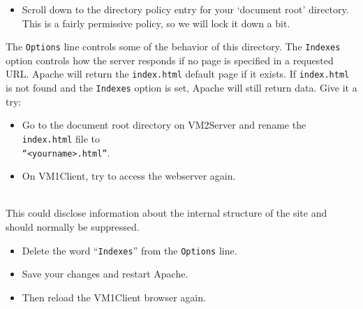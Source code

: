 \documentclass{article}
\begin{document}
\begin{itemize}
\item Scroll down to the directory policy entry for your `document root' directory. This is a fairly permissive policy, so we will lock it down a bit.
\end{itemize}
The {\tt Options} line controls some of the behavior of this directory.  The {\tt Indexes} option controls how the server responds if no page is specified in a requested URL. Apache will return the {\tt index.html} default page if it exists. If {\tt index.html} is not found and the {\tt Indexes} option is set, Apache will still return data. Give it a try:
\begin{itemize}
\item Go to the document root directory on VM2Server and rename the {\tt index.html} file to \\
{\tt``<yourname>.html''}.  
\item On VM1Client, try to access the webserver again.  

\end{itemize}

 \\
\noindent 
This could disclose information about the internal structure of the site and should normally be suppressed. 
\begin{itemize}
\item Delete the word ``{\tt Indexes}'' from the {\tt Options} line.  
\item Save your changes and restart Apache. 
\item Then reload the VM1Client browser again.

\end{itemize}
\end{document}
